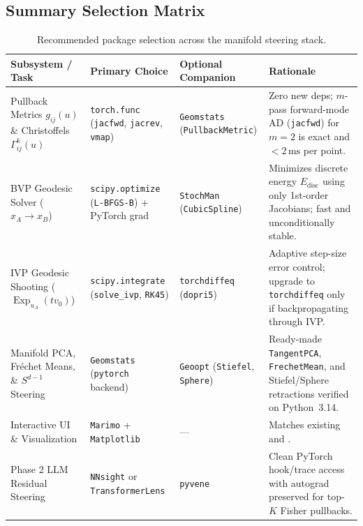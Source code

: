 \documentclass[11pt,a4paper]{article}
\DeclareMathOperator{\Exp}{Exp}
\theoremstyle{definition}
\begin{document}
\subsection{Summary Selection Matrix}

\begin{table}[ht!]
\centering
\small
\renewcommand{\arraystretch}{1.35}
\begin{tabularx}{\textwidth}{@{} >{\raggedright\arraybackslash}p{} >{\raggedright\arraybackslash}p{} >{\raggedright\arraybackslash}p{} Y @{}}
\toprule
\textbf{Subsystem / Task} & \textbf{Primary Choice} & \textbf{Optional Companion} & \textbf{Rationale} \\
\midrule
Pullback Metrics $g_{ij}(u)$ \& Christoffels $\Gamma^k_{ij}(u)$ & \texttt{torch.func} (\texttt{jacfwd}, \texttt{jacrev}, \texttt{vmap}) & \texttt{Geomstats} (\texttt{PullbackMetric}) & Zero new deps; $m$-pass forward-mode AD (\texttt{jacfwd}) for $m=2$ is exact and $<2\,\mathrm{ms}$ per point. \\
\addlinespace
BVP Geodesic Solver ($x_A \to x_B$) & \texttt{scipy.optimize} (\texttt{L-BFGS-B}) + PyTorch grad & \texttt{StochMan} (\texttt{CubicSpline}) & Minimizes discrete energy $E_{\mathrm{disc}}$ using only 1st-order Jacobians; fast and unconditionally stable. \\
\addlinespace
IVP Geodesic Shooting ($\Exp_{u_A}(t v_0)$) & \texttt{scipy.integrate} (\texttt{solve\_ivp}, \texttt{RK45}) & \texttt{torchdiffeq} (\texttt{dopri5}) & Adaptive step-size error control; upgrade to \texttt{torchdiffeq} only if backpropagating through IVP. \\
\addlinespace
Manifold PCA, Fr\'echet Means, \& $S^{d-1}$ Steering & \texttt{Geomstats} (\texttt{pytorch} backend) & \texttt{Geoopt} (\texttt{Stiefel}, \texttt{Sphere}) & Ready-made \texttt{TangentPCA}, \texttt{FrechetMean}, and Stiefel/Sphere retractions verified on Python~3.14. \\
\addlinespace
Interactive UI \& Visualization & \texttt{Marimo} + \texttt{Matplotlib} & --- & Matches existing  and . \\
\addlinespace
Phase 2 LLM Residual Steering & \texttt{NNsight} or \texttt{TransformerLens} & \texttt{pyvene} & Clean PyTorch hook/trace access with autograd preserved for top-$K$ Fisher pullbacks. \\
\bottomrule
\end{tabularx}
\caption{Recommended package selection across the manifold steering stack.}
\label{tab:package-matrix}
\end{table}
\end{document}
